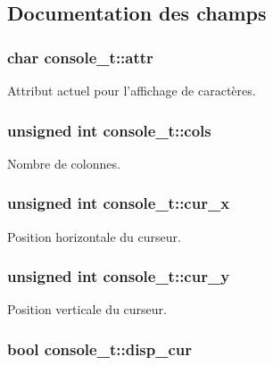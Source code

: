 \subsection{\-Documentation des champs}
\hypertarget{structconsole__t_a07b1c84ea67ce030ebd868917e56b0d9}{
\subsubsection[{attr}]{\setlength{\rightskip}{0pt plus 5cm}char {\bf console\-\_\-t\-::attr}}}\label{structconsole__t_a07b1c84ea67ce030ebd868917e56b0d9}
\-Attribut actuel pour l'affichage de caractères. \hypertarget{structconsole__t_a338612e1f99838e2b34cdb289bc514b8}{
\subsubsection[{cols}]{\setlength{\rightskip}{0pt plus 5cm}unsigned int {\bf console\-\_\-t\-::cols}}}\label{structconsole__t_a338612e1f99838e2b34cdb289bc514b8}
\-Nombre de colonnes. \hypertarget{structconsole__t_a296a99289941514aee3b5751d8cd0693}{
\subsubsection[{cur\-\_\-x}]{\setlength{\rightskip}{0pt plus 5cm}unsigned int {\bf console\-\_\-t\-::cur\-\_\-x}}}\label{structconsole__t_a296a99289941514aee3b5751d8cd0693}
\-Position horizontale du curseur. \hypertarget{structconsole__t_a3192dab00ef66635ae4897943c47d6ec}{
\subsubsection[{cur\-\_\-y}]{\setlength{\rightskip}{0pt plus 5cm}unsigned int {\bf console\-\_\-t\-::cur\-\_\-y}}}\label{structconsole__t_a3192dab00ef66635ae4897943c47d6ec}
\-Position verticale du curseur. \hypertarget{structconsole__t_a6242c03c5b347ed6b0909c1486116bee}{
\subsubsection[{disp\-\_\-cur}]{\setlength{\rightskip}{0pt plus 5cm}bool {\bf console\-\_\-t\-::disp\-\_\-cur}}}\label{structconsole__t_a6242c03c5b347ed6b0909c1486116bee}
